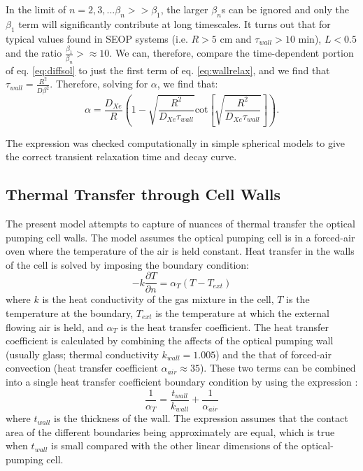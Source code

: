 In the limit of $n=2,3,... \beta_n >> \beta_1 $, the larger $\beta_n$s can be ignored and only the $\beta_1$ term will significantly contribute at long timescales.  It turns out that for typical values found in SEOP systems (i.e. $R>5$ cm and $\tau_{wall}>10$ min), $L<0.5$ and the ratio $\frac{\beta_1}{\beta_n}>\approx10$. We can, therefore, compare the time-dependent portion of eq. \ref{eq:diffsol} to just the first term of eq. \ref{eq:wallrelax}, and we find that $\tau_{wall}=\frac{R^2}{D\beta^2}$. Therefore, solving for $\alpha$, we find that:
\begin{equation}
    \alpha=\frac{D_{Xe}}{R}\left(1-\sqrt{\frac{R^2}{D_{Xe}\tau_{wall}}}\textrm{cot}\left[\sqrt{\frac{R^2}{D_{Xe}\tau_{wall}}}\right]\right).
\end{equation}

The expression was checked computationally in simple spherical models to give the correct transient relaxation time and decay curve.

\subsection{\label{sec:thermtrans} Thermal Transfer through Cell Walls}
The present model attempts to capture of nuances of thermal transfer the optical pumping cell walls. The model assumes the optical pumping cell is in a forced-air oven where the temperature of the air is held constant. Heat transfer in the walls of the cell is solved by imposing the boundary condition:
\begin{equation}
    -k\frac{\partial T}{\partial n}=\alpha_T\left(T-T_{ext}\right)
    \label{eq:tempboundary}
\end{equation}
where $k$ is the heat conductivity of the gas mixture in the cell, $T$ is the temperature at the boundary, $T_{ext}$ is the temperature at which the external flowing air is held, and $\alpha_T$ is the heat transfer coefficient. The heat transfer coefficient is calculated by combining the affects of the optical pumping wall (usually glass; thermal conductivity $k_{wall} = 1.005$) and the that of forced-air convection (heat transfer coefficient $\alpha_{air} \approx 35$). These two terms can be combined into a single heat transfer coefficient boundary condition by using the expression \cite{Bird2007}:
\begin{equation}
    \frac{1}{\alpha_T}=\frac{t_{wall}}{k_{wall}}+\frac{1}{\alpha_{air}}
    \label{eq:overheattranscoef}
\end{equation}
where $t_{wall}$ is the thickness of the wall. The expression assumes that the contact area of the different boundaries being approximately are equal, which is true when $t_{wall}$ is small compared with the other linear dimensions of the optical-pumping cell.

